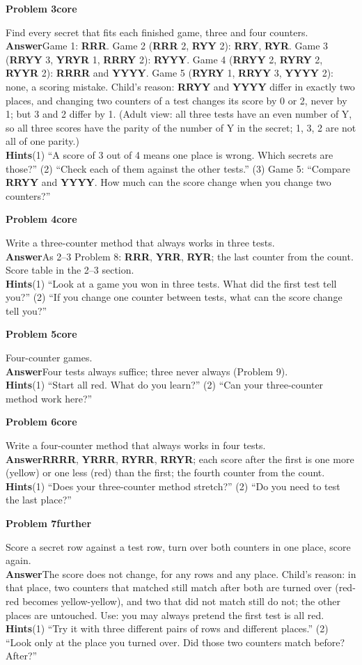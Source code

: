 \documentclass[11pt]{article}
\newcommand{\cd}[1]{\mbox{\textsf{\textbf{#1}}}}   %
\newcommand{\core}{\textcolor{tagcore}{\textbf{core}}}
\newcommand{\further}{\textcolor{tagmore}{\textbf{further}}}
\newcommand{\pb}[3]{\par\needspace{5\baselineskip}\medskip\textbf{Problem #1}\enspace{\small page #2}\enspace\textperiodcentered\enspace #3\par\nopagebreak}
\newcommand{\lab}[1]{\textbf{#1}\enspace}
\newcommand{\hints}[1]{\lab{Hints}#1}
\begin{document}
\pb{3}{3}{\core}
Find every secret that fits each finished game, three and four counters.\\
\lab{Answer}Game 1: \cd{RRR}. Game 2 (\cd{RRR} 2, \cd{RYY} 2): \cd{RRY}, \cd{RYR}. Game 3 (\cd{RRYY} 3, \cd{YRYR} 1, \cd{RRRY} 2): \cd{RYYY}. Game 4 (\cd{RRYY} 2, \cd{RYRY} 2, \cd{RYYR} 2): \cd{RRRR} and \cd{YYYY}. Game 5 (\cd{RYRY} 1, \cd{RRYY} 3, \cd{YYYY} 2): none, a scoring mistake. Child's reason: \cd{RRYY} and \cd{YYYY} differ in exactly two places, and changing two counters of a test changes its score by 0 or 2, never by 1; but 3 and 2 differ by 1. (Adult view: all three tests have an even number of Y, so all three scores have the parity of the number of Y in the secret; 1, 3, 2 are not all of one parity.)\\
\hints{(1) ``A score of 3 out of 4 means one place is wrong. Which secrets are those?'' (2) ``Check each of them against the other tests.'' (3) Game 5: ``Compare \cd{RRYY} and \cd{YYYY}. How much can the score change when you change two counters?''}

\pb{4}{4}{\core}
Write a three-counter method that always works in three tests.\\
\lab{Answer}As 2--3 Problem 8: \cd{RRR}, \cd{YRR}, \cd{RYR}; the last counter from the count. Score table in the 2--3 section.\\
\hints{(1) ``Look at a game you won in three tests. What did the first test tell you?'' (2) ``If you change one counter between tests, what can the score change tell you?''}

\pb{5}{5}{\core}
Four-counter games.\\
\lab{Answer}Four tests always suffice; three never always (Problem 9).\\
\hints{(1) ``Start all red. What do you learn?'' (2) ``Can your three-counter method work here?''}

\pb{6}{6}{\core}
Write a four-counter method that always works in four tests.\\
\lab{Answer}\cd{RRRR}, \cd{YRRR}, \cd{RYRR}, \cd{RRYR}; each score after the first is one more (yellow) or one less (red) than the first; the fourth counter from the count.\\
\hints{(1) ``Does your three-counter method stretch?'' (2) ``Do you need to test the last place?''}

\pb{7}{7}{\further}
Score a secret row against a test row, turn over both counters in one place, score again.\\
\lab{Answer}The score does not change, for any rows and any place. Child's reason: in that place, two counters that matched still match after both are turned over (red-red becomes yellow-yellow), and two that did not match still do not; the other places are untouched. Use: you may always pretend the first test is all red.\\
\hints{(1) ``Try it with three different pairs of rows and different places.'' (2) ``Look only at the place you turned over. Did those two counters match before? After?''}
\end{document}
